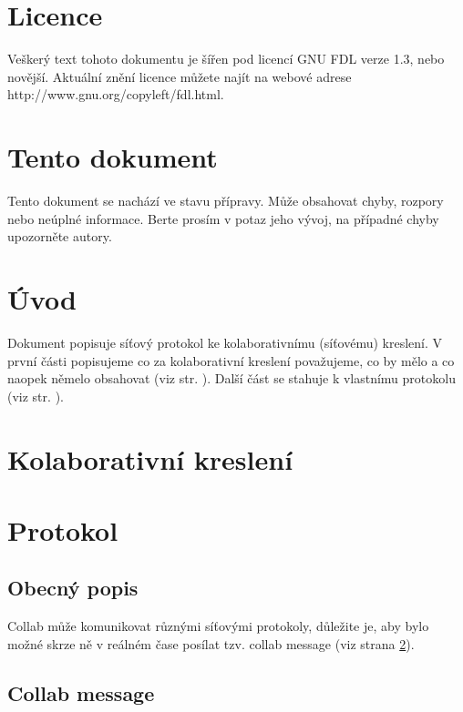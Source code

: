 \documentclass[12pt,oneside,a4paper]{report}
\begin{document}
\tableofcontents
\newpage

\part{Licence}

Veškerý text tohoto dokumentu je šířen pod licencí GNU FDL verze 1.3, nebo novější. Aktuální znění licence můžete najít na webové adrese http://www.gnu.org/copyleft/fdl.html.

\part{Tento dokument}

Tento dokument se nachází ve stavu přípravy. Může obsahovat chyby, rozpory nebo neúplné informace. Berte prosím v potaz jeho vývoj, na případné chyby upozorněte autory.


\part{Úvod}

Dokument popisuje síťový protokol ke kolaborativnímu (síťovému) kreslení. V první části popisujeme co za kolaborativní kreslení považujeme, co by mělo a co naopek němelo obsahovat (viz str. \ref{part.colaborative-painting}). Další část se stahuje k vlastnímu protokolu (viz str. \ref{part.protocol}).

\part{Kolaborativní kreslení}
\label{part.colaborative-painting}


\part{Protokol}
\label{part.protocol}


\chapter{Obecný popis}

Collab může komunikovat různými síťovými protokoly, důležite je, aby bylo možné skrze ně v reálném čase posílat tzv. collab message (viz strana \ref{text.collab_message}).

\chapter{Collab message}
\label{text.collab_message}
\end{document}
